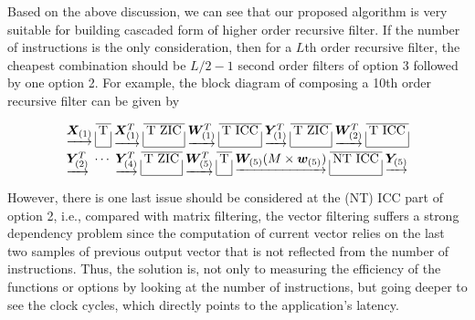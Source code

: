 Based on the above discussion, we can see that our proposed algorithm is very suitable for building cascaded form of higher order recursive filter.
If the number of instructions is the only consideration, then for a $L$th order recursive filter,
the cheapest combination should be $L/2{-}1$ second order filters of option 3 followed by one option 2.
For example, the block diagram of composing a 10th order recursive filter can be given by

\begin{equation*}
    \label{eq:4_cascaded_option_3_1_option_2}
    \begin{aligned}
    & \arraycolsep=2.3pt\def\arraystretch{1.0}
    \begin{array}{c|c|c|c|c|c|c|c|c|c|}
        \cline{2-2}
        \cline{4-4}
        \cline{6-6}
        \cline{8-8}
        \cline{10-10}
        \underrightarrow{\bm{X}_{(1)}} & \text{T} & \underrightarrow{\bm{X}_{(1)}^T} & \text{T ZIC} & \underrightarrow{\bm{W}_{(1)}^T} & \text{T ICC} & \underrightarrow{\bm{Y}_{(1)}^T} & \text{T ZIC} & \underrightarrow{\bm{W}_{(2)}^T} & \text{T ICC} \\
        \cline{2-2}
        \cline{4-4}
        \cline{6-6}
        \cline{8-8}
        \cline{10-10}
    \end{array} \\
    & \arraycolsep=2.3pt\def\arraystretch{1.0} 
    \begin{array}{ccc|c|c|c|c|c|c}
        \cline{4-4}
        \cline{6-6}
        \cline{8-8}
        \underrightarrow{\bm{Y}_{(2)}^T} & \cdots & \underrightarrow{\bm{Y}_{(4)}^T} & \text{T ZIC} & \underrightarrow{\bm{W}_{(5)}^T} & \text{T} & \underrightarrow{\bm{W}_{(5)}(M \times \bm{w}_{(5)})} & \text{NT ICC} & \underrightarrow{\bm{Y}_{(5)}} \\
        \cline{4-4}
        \cline{6-6}
        \cline{8-8}
    \end{array} \\
\end{aligned}
\end{equation*}

However, there is one last issue should be considered at the (NT) ICC part of option 2,
i.e., compared with matrix filtering, the vector filtering suffers a strong dependency problem since 
the computation of current vector relies on the last two samples of previous output vector that is not reflected from the number of instructions.
Thus, the solution is, not only to measuring the efficiency of the functions or options 
by looking at the number of instructions, but going deeper to see the clock cycles, which 
directly points to the application's latency.

